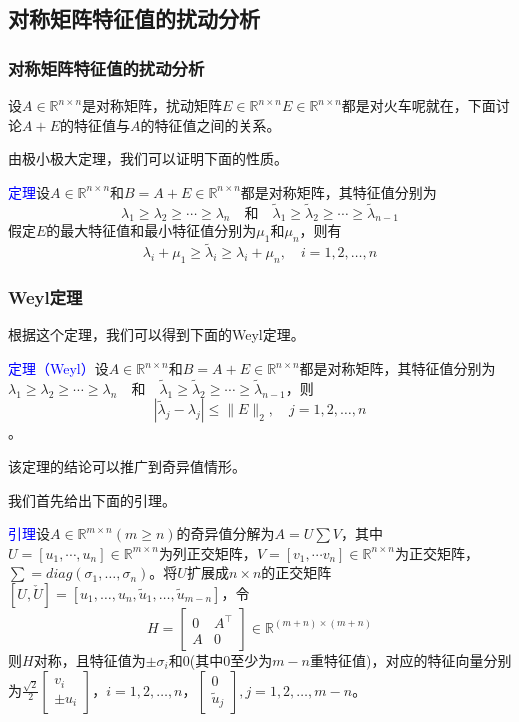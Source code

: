 \documentclass[notheorems,serif]{beamer}
\begin{document}
\subsection*{对称矩阵特征值的扰动分析}
\begin{frame}
\frametitle{对称矩阵特征值的扰动分析}



设$A \in \mathbb{R}^{n \times n}$是对称矩阵，扰动矩阵$E \in \mathbb{R}^{n \times n}$$E \in \mathbb{R}^{n \times n}$都是对火车呢就在，下面讨论$A+E$的特征值与$A$的特征值之间的关系。

由极小极大定理，我们可以证明下面的性质。

\textcolor{blue}{定理}\quad 设$A \in \mathbb{R}^{n \times n}$和$B=A+E \in \mathbb{R}^{n \times n}$都是对称矩阵，其特征值分别为$$
\lambda_{1} \geq \lambda_{2} \geq \cdots \geq \lambda_{n} \quad \text{和}  \quad \tilde{\lambda}_{1} \geq \tilde{\lambda}_{2} \geq \cdots \geq \tilde{\lambda}_{n-1}
$$假定$E$的最大特征值和最小特征值分别为$\mu_{1}$和$\mu_{n}$，则有$$
\lambda_{i}+\mu_{1} \geq \tilde{\lambda}_{i} \geq \lambda_{i}+\mu_{n}, \quad i=1,2, \ldots, n
$$
\end{frame}
\begin{frame}
\frametitle{Weyl定理}


根据这个定理，我们可以得到下面的Weyl定理。

\textcolor{blue}{定理（Weyl）}\quad 设$A \in \mathbb{R}^{n \times n}$和$B=A+E \in \mathbb{R}^{n \times n}$都是对称矩阵，其特征值分别为$
\lambda_{1} \geq \lambda_{2} \geq \cdots \geq \lambda_{n} \quad \text{和}  \quad \tilde{\lambda}_{1} \geq \tilde{\lambda}_{2} \geq \cdots \geq \tilde{\lambda}_{n-1}
$，则$$
\left|\tilde{\lambda}_{j}-\lambda_{j}\right| \leq\|E\|_{2}, \quad j=1,2, \ldots, n
$$。

该定理的结论可以推广到奇异值情形。
\end{frame}
\begin{frame}

我们首先给出下面的引理。

\textcolor{blue}{引理}\quad 设$A \in \mathbb{R}^{m \times n}(m \geq n)$的奇异值分解为$A=U\sum V$，其中$U=[u_1,\cdots ,u_n]\in \mathbb{R}^{m \times n}$为列正交矩阵，$V=[v_1,\cdots v_n]\in \mathbb{R}^{n \times n}$为正交矩阵，$\sum =diag(\sigma_{1}, \ldots, \sigma_{n})$。将$U$扩展成$n\times n$的正交矩阵$[U, \check{U}]=\left[u_{1}, \dots, u_{n}, \tilde{u}_{1}, \ldots, \tilde{u}_{m-n}\right]$，令$$
H=\left[\begin{array}{cc}{0} & {A^{\top}} \\ {A} & {0}\end{array}\right] \in \mathbb{R}^{(m+n) \times(m+n)}
$$
则$H$对称，且特征值为$\pm \sigma_{i}$和$0$(其中$0$至少为$m-n$重特征值)，对应的特征向量分别为$\frac{\sqrt{2}}{2}\left[\begin{array}{c}{v_{i}} \\ { \pm u_{i}}\end{array}\right]$，$i=1,2, \dots, n$，$\left[\begin{array}{c}{0} \\ {\tilde{u}_{j}}\end{array}\right], j=1,2, \ldots, m-n$。
\end{frame}
\end{document}
